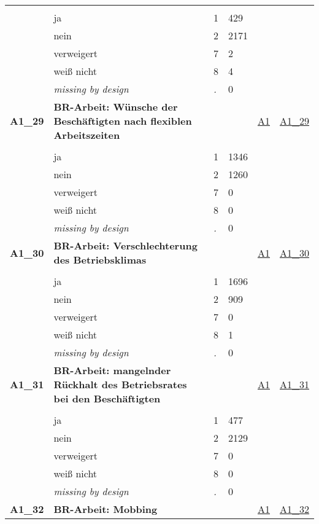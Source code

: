 \begin{longtable}{| L{2.45cm} | L{6cm} | C{1.5cm} | R{1cm} | C{2.25cm} | C{2.25cm} |}
   &  &  &  &  &  \\ 
   & ja & 1 & 429 &  &  \\ 
   & nein & 2 & 2171 &  &  \\ 
   & verweigert & 7 & 2 &  &  \\ 
   & weiß nicht & 8 & 4 &  &  \\ 
   & \textit{missing by design} & \textit{.} & 0 &  &  \\ 
   \midrule
\textbf{A1\_29}\label{var:A1:29} & \textbf{BR-Arbeit: Wünsche der Beschäftigten nach flexiblen Arbeitszeiten} &  &  & \hyperref[A1]{A1} & \hyperref[var:suf:A1:29]{A1\_29} \\ 
   &  &  &  &  &  \\ 
   & ja & 1 & 1346 &  &  \\ 
   & nein & 2 & 1260 &  &  \\ 
   & verweigert & 7 & 0 &  &  \\ 
   & weiß nicht & 8 & 0 &  &  \\ 
   & \textit{missing by design} & \textit{.} & 0 &  &  \\ 
   \midrule
\textbf{A1\_30}\label{var:A1:30} & \textbf{BR-Arbeit: Verschlechterung des Betriebsklimas} &  &  & \hyperref[A1]{A1} & \hyperref[var:suf:A1:30]{A1\_30} \\ 
   &  &  &  &  &  \\ 
   & ja & 1 & 1696 &  &  \\ 
   & nein & 2 & 909 &  &  \\ 
   & verweigert & 7 & 0 &  &  \\ 
   & weiß nicht & 8 & 1 &  &  \\ 
   & \textit{missing by design} & \textit{.} & 0 &  &  \\ 
   \midrule
\textbf{A1\_31}\label{var:A1:31} & \textbf{BR-Arbeit: mangelnder Rückhalt des Betriebsrates bei den Beschäftigten} &  &  & \hyperref[A1]{A1} & \hyperref[var:suf:A1:31]{A1\_31} \\ 
   &  &  &  &  &  \\ 
   & ja & 1 & 477 &  &  \\ 
   & nein & 2 & 2129 &  &  \\ 
   & verweigert & 7 & 0 &  &  \\ 
   & weiß nicht & 8 & 0 &  &  \\ 
   & \textit{missing by design} & \textit{.} & 0 &  &  \\ 
   \midrule
\textbf{A1\_32}\label{var:A1:32} & \textbf{BR-Arbeit: Mobbing} &  &  & \hyperref[A1]{A1} & \hyperref[var:suf:A1:32]{A1\_32} \\ 

\end{longtable}

